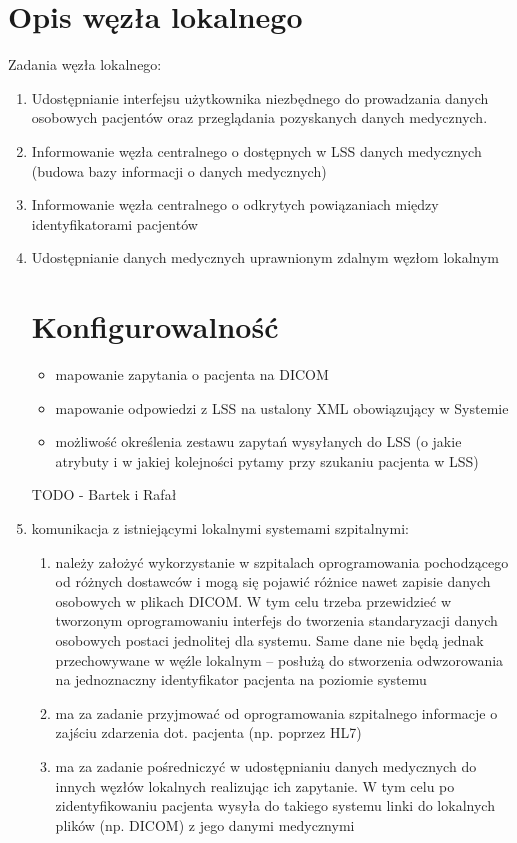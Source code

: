 \documentclass[a4paper]{report}
\begin{document}
\section{Opis węzła lokalnego}
Zadania węzła lokalnego:
\begin{enumerate}
\item Udostępnianie interfejsu użytkownika niezbędnego do prowadzania danych osobowych pacjentów
      oraz przeglądania pozyskanych danych medycznych.
\item Informowanie węzła centralnego o dostępnych w LSS danych medycznych (budowa bazy informacji o danych medycznych)
\item Informowanie węzła centralnego o odkrytych powiązaniach między identyfikatorami pacjentów
\item Udostępnianie danych medycznych uprawnionym zdalnym węzłom lokalnym

\section{Konfigurowalność}

\begin{itemize}
  \item mapowanie zapytania o pacjenta na DICOM
  \item mapowanie odpowiedzi z LSS na ustalony XML obowiązujący w Systemie
  \item możliwość określenia zestawu zapytań wysyłanych do LSS (o jakie atrybuty i w jakiej kolejności
  pytamy przy szukaniu pacjenta w LSS)
\end{itemize}

TODO - Bartek i Rafał

\item komunikacja z istniejącymi lokalnymi systemami szpitalnymi:
  \begin{enumerate}
  \item należy założyć wykorzystanie w szpitalach oprogramowania pochodzącego od różnych dostawców i mogą
        się pojawić różnice nawet zapisie danych osobowych w plikach DICOM. W tym celu trzeba przewidzieć
        w tworzonym oprogramowaniu interfejs do tworzenia standaryzacji danych osobowych postaci jednolitej
        dla systemu. Same dane nie będą jednak przechowywane w węźle lokalnym – posłużą do stworzenia odwzorowania
        na jednoznaczny identyfikator pacjenta na poziomie systemu
  \item ma za zadanie przyjmować od oprogramowania szpitalnego informacje o zajściu zdarzenia dot.
        pacjenta (np. poprzez HL7)
  \item ma za zadanie pośredniczyć w udostępnianiu danych medycznych do innych węzłów lokalnych realizując
        ich zapytanie. W tym celu po zidentyfikowaniu pacjenta wysyła do takiego systemu linki do lokalnych
        plików (np. DICOM) z jego danymi medycznymi
  \end{enumerate}


\end{enumerate}
\end{document}
